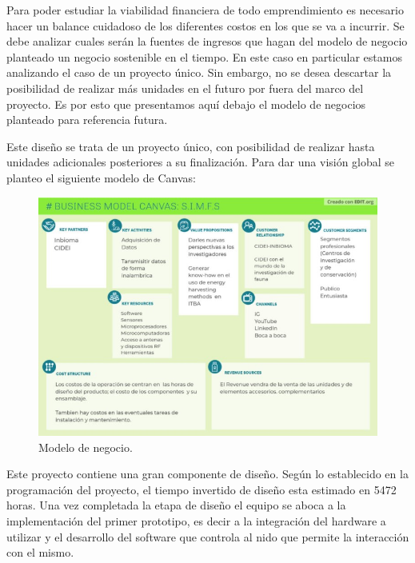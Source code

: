 Para poder estudiar la viabilidad financiera de todo emprendimiento es necesario hacer un balance cuidadoso de los diferentes costos en los que se va a incurrir. Se debe analizar cuales serán la fuentes de ingresos que hagan del modelo de negocio planteado un negocio sostenible en el tiempo. 
En este caso en particular estamos analizando el caso de un proyecto único. Sin embargo, no se desea descartar la posibilidad de realizar más unidades en el futuro por fuera del marco del proyecto. Es por esto que presentamos aquí debajo el modelo de negocios planteado para referencia futura. 

Este diseño se trata de un proyecto único, con posibilidad de realizar hasta \unidadespostfin unidades adicionales posteriores a su finalización. Para dar una visión global se planteo el siguiente modelo de Canvas:
 

\begin{figure}[H]
	\centering
	\includegraphics[scale=0.7]{../Factibilidad/ImagenesFactibilidad/ModeloDeCanvas}
	\caption{Modelo de negocio.}
	\label{fig:modelodecanvas}
\end{figure}



Este proyecto contiene una gran componente de diseño. Según lo establecido en la programación del proyecto, el tiempo invertido de diseño esta estimado en 5472 horas. %
Una vez completada la etapa de diseño el equipo se aboca a la implementación del primer prototipo, es decir a la integración del hardware a utilizar y el desarrollo del software que controla al nido que permite la interacción con el mismo. 


